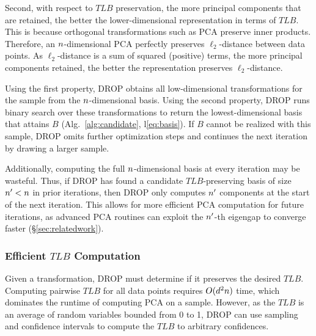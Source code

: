 Second, with respect to $TLB$ preservation, the more principal components that are retained, the better the lower-dimensional representation in terms of $TLB$.  
This is because orthogonal transformations such as PCA preserve inner products. 
Therefore, an ${\color{black}n}$-dimensional PCA perfectly preserves $\ell_2$-distance between data points. 
As $\ell_2$-distance is a sum of squared (positive) terms, the more principal components retained, the better the representation preserves $\ell_2$-distance.

Using the first property, DROP obtains all low-dimensional transformations for the sample from the ${\color{black}n}$-dimensional basis.  
Using the second property, DROP runs binary search over these transformations to return the lowest-dimensional basis that attains $B$ (Alg.~\ref{alg:candidate}, l\ref{eq:basis}).
If $B$ cannot be realized with this sample, DROP omits further optimization steps and continues the next iteration by drawing a larger sample.

Additionally, computing the full ${\color{black}n}$-dimensional basis at every iteration may be wasteful. 
Thus, if DROP has found a candidate $TLB$-preserving basis of size ${\color{black}n}' < {\color{black}n}$ in prior iterations, then DROP only computes ${\color{black}n}'$ components at the start of the next iteration.
This allows for more efficient PCA computation for future iterations, as advanced PCA routines can exploit the ${\color{black}n}'$-th eigengap to converge faster (\S\ref{sec:relatedwork}).



\subsubsection{Efficient $TLB$ Computation}

Given a transformation, DROP must determine if it preserves the desired $TLB$.
Computing pairwise $TLB$ for all data points requires $O({\color{black}d}^2{\color{black}n})$ time, which dominates the runtime of computing PCA on a sample.
However, as the $TLB$ is an average of random variables bounded from 0 to 1, DROP can use sampling and confidence intervals to compute the $TLB$ to arbitrary confidences.

